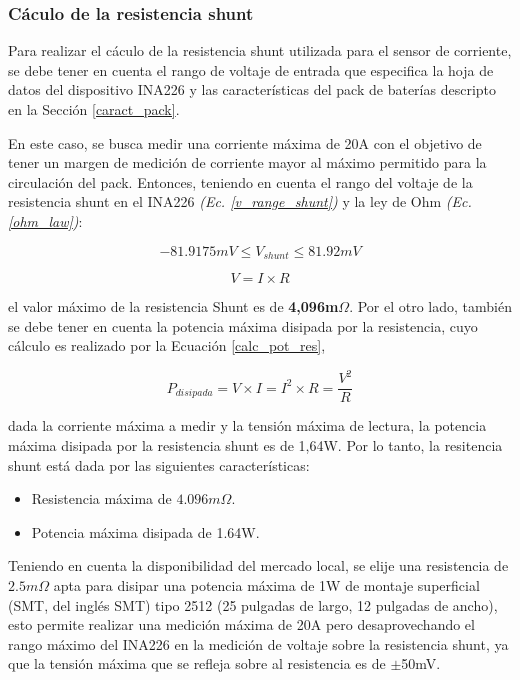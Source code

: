 \documentclass[10pt, a4paper]{article}
\begin{document}
\subsubsection{C\'aculo de la resistencia shunt}

Para realizar el c\'aculo de la resistencia shunt utilizada para el sensor de
corriente, se debe tener en cuenta el rango de voltaje de entrada que
especifica la hoja de datos del dispositivo INA226 y las caracter\'isticas del
pack de bater\'ias descripto en la Secci\'on \ref{caract_pack}. 

En este caso, se busca medir una corriente m\'axima de 20A con el objetivo de
tener un margen de medici\'on de corriente mayor al m\'aximo permitido para la
circulaci\'on del pack. Entonces, teniendo en cuenta el rango del voltaje de
la resistencia shunt en el INA226 \emph{(Ec. \ref{v_range_shunt})} y la ley de
Ohm \emph{(Ec. \ref{ohm_law})}:

\begin{equation}
    -81.9175mV \le V_{shunt} \le 81.92mV  \label{v_range_shunt}
\end{equation}

\begin{equation}
    V=I \times R \label{ohm_law}
\end{equation}

el valor m\'aximo de la resistencia Shunt es de \textbf{4,096m$\Omega$}. Por el
otro lado, tambi\'en se debe tener en cuenta la potencia m\'axima disipada por
la resistencia, cuyo c\'alculo es realizado por la Ecuaci\'on 
\ref{calc_pot_res},

\begin{equation}
    P_{disipada} = V \times I = I^2 \times R = \frac{V^2}{R} \label{calc_pot_res}
\end{equation}

dada la corriente m\'axima a medir y la tensi\'on m\'axima de lectura, la
potencia m\'axima disipada por la resistencia shunt es de 1,64W. Por lo tanto,
la resitencia shunt est\'a dada por las siguientes caracter\'isticas:

\begin{itemize}
    \item Resistencia m\'axima de $4.096m\Omega$.
    \item Potencia m\'axima disipada de 1.64W.
\end{itemize}

Teniendo en cuenta la disponibilidad del mercado local, se elije una resistencia 
de $2.5m\Omega$ apta para disipar una potencia m\'axima de 1W de montaje
superficial (\acrshort{SMT}, del ingl\'es \acrlong{SMT}) tipo 2512 
(25 pulgadas de largo, 12 pulgadas de ancho), esto permite realizar una
medici\'on m\'axima de 20A pero desaprovechando el rango m\'aximo del INA226 en
la medici\'on de voltaje sobre la resistencia shunt, ya que la tensi\'on
m\'axima que se refleja sobre al resistencia es de $\mathrm{\pm}$50mV.
\end{document}
